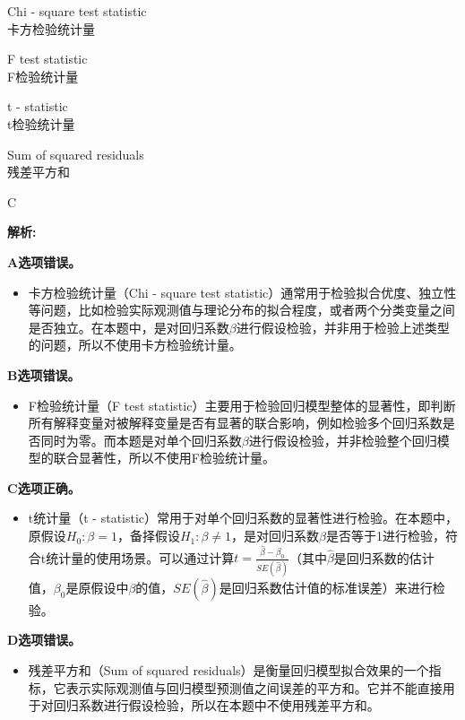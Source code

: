 \documentclass{article}
\newenvironment{explanation}
{\textbf{解析:}\par}
{\par}
\begin{document}
        \begin{choices}
            \item Chi - square test statistic\\
            卡方检验统计量
            \item F test statistic\\
            F检验统计量
            \item t - statistic\\
            t检验统计量
            \item Sum of squared residuals\\
            残差平方和
        \end{choices}
        
        \begin{correctanswer}
            C
        \end{correctanswer}
        
        \begin{explanation}
        \textbf{A选项错误。}
        \begin{itemize}
        \item 卡方检验统计量（Chi - square test statistic）通常用于检验拟合优度、独立性等问题，比如检验实际观测值与理论分布的拟合程度，或者两个分类变量之间是否独立。在本题中，是对回归系数\(\beta\)进行假设检验，并非用于检验上述类型的问题，所以不使用卡方检验统计量。
        \end{itemize}
        \textbf{B选项错误。}
        \begin{itemize}
        \item F检验统计量（F test statistic）主要用于检验回归模型整体的显著性，即判断所有解释变量对被解释变量是否有显著的联合影响，例如检验多个回归系数是否同时为零。而本题是对单个回归系数\(\beta\)进行假设检验，并非检验整个回归模型的联合显著性，所以不使用F检验统计量。
        \end{itemize}
        \textbf{C选项正确。}
        \begin{itemize}
        \item t统计量（t - statistic）常用于对单个回归系数的显著性进行检验。在本题中，原假设\(H_0: \beta = 1\)，备择假设\(H_1: \beta \neq 1\)，是对回归系数\(\beta\)是否等于1进行检验，符合t统计量的使用场景。可以通过计算\(t=\frac{\hat{\beta}-\beta_0}{SE(\hat{\beta})}\)（其中\(\hat{\beta}\)是回归系数的估计值，\(\beta_0\)是原假设中\(\beta\)的值，\(SE(\hat{\beta})\)是回归系数估计值的标准误差）来进行检验。
        \end{itemize}
        \textbf{D选项错误。}
        \begin{itemize}
        \item 残差平方和（Sum of squared residuals）是衡量回归模型拟合效果的一个指标，它表示实际观测值与回归模型预测值之间误差的平方和。它并不能直接用于对回归系数进行假设检验，所以在本题中不使用残差平方和。
        \end{itemize}
        \end{explanation}
        
\end{document}
